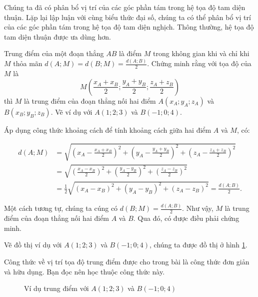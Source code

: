 Chúng ta đã có phân bổ vị trí của các góc phần tám trong hệ tọa độ tam diện thuận. Lặp lại lập luận với cùng biểu thức đại số, chúng ta có thể phân bổ vị trí của các góc phần tám trong hệ tọa độ tam diện nghịch. Thông thường, hệ tọa độ tam diện thuận được ưa dùng hơn.

\exercise Trung điểm của một đoạn thẳng $AB$ là điểm $M$ trong không gian khi và chỉ khi $M$ thỏa mãn $d(A;M) = d(B;M) = \frac{d(A;B)}{2}$. Chứng minh rằng với tọa độ của $M$ là $$M\left(\frac{x_A+x_B}{2}; \frac{y_A+y_B}{2}; \frac{z_A+z_B}{2}\right)$$ thì $M$ là trung điểm của đoạn thẳng nối hai điểm $A(x_A; y_A; z_A)$ và $B(x_B; y_B; z_B)$. Vẽ ví dụ với $A(1;2;3)$ và $B(-1;0;4)$.

\solution

Áp dụng công thức khoảng cách để tính khoảng cách giữa hai điểm $A$ và $M$, có:

\begin{align*}
   d(A;M) &= \sqrt{\left(x_A - \frac{x_A+x_B}{2}\right)^2 + \left(y_A - \frac{y_A+y_B}{2}\right)^2 + \left(z_A - \frac{z_A+z_B}{2}\right)^2} \\
   &= \sqrt{\left(\frac{x_A-x_B}{2}\right)^2 + \left(\frac{y_A-y_B}{2}\right)^2 + \left(\frac{z_A-z_B}{2}\right)^2} \\
   &= \frac{1}{2} \sqrt{(x_A-x_B)^2 + (y_A-y_B)^2 + (z_A-z_B)^2} = \frac{d(A;B)}{2}.
\end{align*}

Một cách tương tự, chúng ta cúng có $d(B;M) = \frac{d(A;B)}{2}$. Như vậy, $M$ là trung điểm của đoạn thẳng nối hai điểm $A$ và $B$. Qua đó, có được điều phải chứng minh.

Vẽ đồ thị ví dụ với $A(1;2;3)$ và $B(-1;0;4)$, chúng ta được đồ thị ở hình \ref{fig:trung diem}.

Công thức về vị trí tọa độ trung điểm được cho trong bài là công thức đơn giản và hữu dụng. Bạn đọc nên học thuộc công thức này.

\begin{figure}[H]
   \centering
   \caption{Ví dụ trung điểm với $A(1;2;3)$ và $B(-1;0;4)$}
   \label{fig:trung diem}
\end{figure}